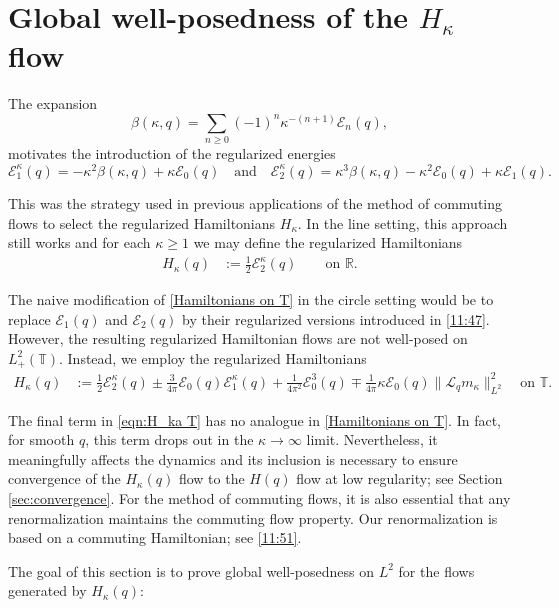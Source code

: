 \documentclass{amsart}
\numberwithin{equation}{section}
\theoremstyle{definition}
\newcommand{\ka}{\kappa}
\newcommand{\R}{\mathbb{R}}
\newcommand{\T}{\mathbb{T}}
\newcommand{\E}{\mathcal{E}}
\newcommand{\Lc}{\mathcal{L}}
\newcommand{\qtq}[1]{\quad\text{#1}\quad}
\begin{document}
\section{Global well-posedness of the $H_\ka$ flow}\label{sec:GWP_kappa}
The expansion 
$$
\beta(\ka,q)=\sum_{n\geq0}(-1)^n\ka^{-(n+1)}\mathcal{E}_n(q),
$$
motivates the introduction of the regularized energies
\begin{equation}\label{11:47}
\E_1^\ka(q)=-\ka^2\beta(\ka,q) + \ka\E_0(q) \qtq{and}  \E_2^{\ka}(q)=\ka^3\beta(\ka,q)-\ka^2\E_0(q)+\ka\E_1(q).
\end{equation}

This was the strategy used in previous applications of the method of commuting flows to select the regularized Hamiltonians $H_\ka$.  In the line setting, this approach still works and for each $\kappa\geq 1$ we may define the regularized Hamiltonians
\begin{align}
H_{\ka}(q)&:=\tfrac12 \E_2^{\ka}(q)  \qquad \text{on $\R$}.  \label{eqn:H_ka R}
\end{align}

The naive modification of \eqref{Hamiltonians on T} in the circle setting would be to replace $\E_1(q)$ and $\E_2(q)$ by their regularized versions introduced in \eqref{11:47}. However, the resulting regularized Hamiltonian flows are not well-posed on $L^2_+(\T)$. Instead, we employ the regularized Hamiltonians
\begin{align}
H_{\ka}(q)&:=\tfrac12 \E_2^{\ka}(q)\pm\tfrac{3}{4\pi}\E_0(q)\E_1^{\ka}(q)+\tfrac{1}{4\pi^2}\E_0^3(q)\mp\tfrac1{4\pi} \ka\E_0(q)\| \Lc_qm_\kappa\|_{L^2}^2 \quad \text{on $\T$}.\label{eqn:H_ka T}
\end{align}

The final term in \eqref{eqn:H_ka T} has no analogue in \eqref{Hamiltonians on T}.  In fact, for smooth $q$, this term drops out in the $\ka\to\infty$ limit.  Nevertheless, it meaningfully affects the dynamics and its inclusion is necessary to ensure convergence of the $H_\ka(q)$ flow to the $H(q)$ flow at low regularity; see Section \ref{sec:convergence}. For the method of commuting flows, it is also essential that any renormalization maintains the commuting flow property. Our renormalization is based on a commuting Hamiltonian; see \eqref{11:51}.

The goal of this section is to prove global well-posedness on $L^2$ for the flows generated by $H_\ka(q)$:
\end{document}
